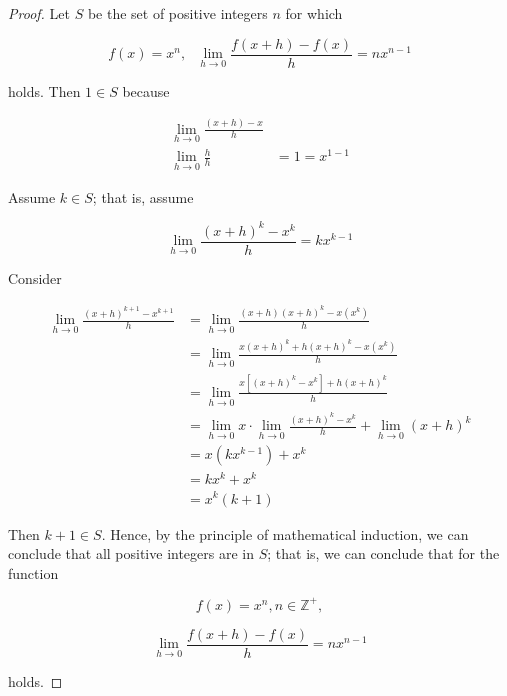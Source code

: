 \documentclass{article}
\begin{document}
    \begin{proof}
        Let $S$ be the set of positive integers $n$ for which

        \[
            f(x)=x^n, \text{   } \lim_{h\to 0}\frac{f(x+h)-f(x)}{h}=nx^{n-1}
        \]

        holds. Then $1\in S$ because

        \begin{align*}
            \lim_{h\to 0}\frac{(x+h)-x}{h} & \\
            \lim_{h\to 0}\frac{h}{h} &= 1 = x^{1-1}
        \end{align*}

        Assume $k\in S$; that is, assume

        \[
            \lim_{h\to 0} \frac{(x+h)^k - x^k}{h} = kx^{k-1}
        \]

        Consider

        \begin{align*}
            \lim_{h\to 0} \frac{(x+h)^{k+1} - x^{k+1}}{h}   &= \lim_{h\to 0} \frac{(x+h)(x+h)^k - x(x^k)}{h} \\
                                                            &= \lim_{h\to 0} \frac{x(x+h)^k + h(x+h)^k - x(x^k)}{h} \\
                                                            &= \lim_{h\to 0} \frac{x\left[(x+h)^k - x^k\right] + h(x+h)^k}{h} \\
                                                            &= \lim_{h\to 0} x \cdot \lim_{h\to 0} \frac{(x+h)^k - x^k}{h} + \lim_{h\to 0} (x+h)^{k} \\
                                                            &= x(kx^{k-1}) + x^k \\
                                                            &= kx^k + x^k \\
                                                            &= x^k (k+1)
        \end{align*}

        Then $k+1\in S$. Hence, by the principle of mathematical induction, we can conclude that all positive integers are in $S$; that is, we can conclude that for the function

        \[
            f(x) = x^n, n\in \mathbb{Z}^+,
        \]

        \[
            \lim_{h\to 0} \frac{f(x+h)-f(x)}{h} = nx^{n-1}
        \]

        holds.
    \end{proof}
\end{document}

